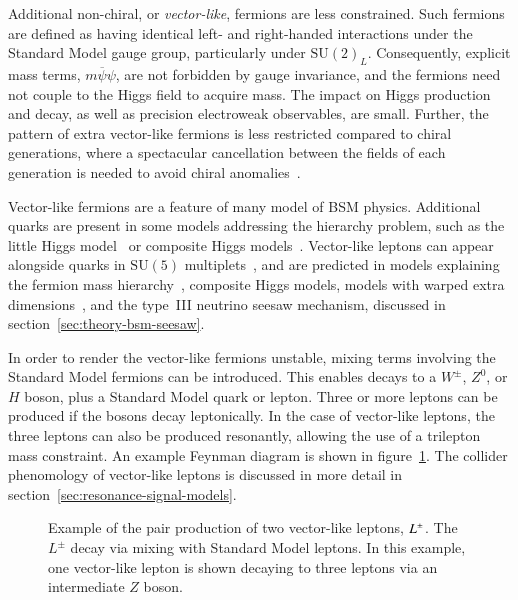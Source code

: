 Additional non-chiral, or \emph{vector-like}, fermions are less constrained. Such fermions are defined as having identical left- and right-handed interactions under the Standard Model gauge group, particularly under $\mathrm{SU}(2)_L$. Consequently, explicit mass terms, $m\overline{\psi}\psi$, are not forbidden by gauge invariance, and the fermions need not couple to the Higgs field to acquire mass. The impact on Higgs production and decay, as well as precision electroweak observables, are small. Further, the pattern of extra vector-like fermions is less restricted compared to chiral generations, where a spectacular cancellation between the fields of each generation is needed to avoid chiral anomalies~\cite{Geng:1988pr}. 

Vector-like fermions are a feature of many model of BSM physics. Additional quarks are present in some models addressing the hierarchy problem, such as the little Higgs model~\cite{Arkani-Hamed:557546} or composite Higgs models~\cite{Kaplan:148688}. Vector-like leptons can appear alongside quarks in $\mathrm{SU}(5)$ multiplets~\cite{Martin:2012dx}, and are predicted in models explaining the fermion mass hierarchy~\cite{Falkowski:2014hs}, composite Higgs models, models with warped extra dimensions~\cite{Redi:2013ib,Contino:1005586}, and the type~III neutrino seesaw mechanism, discussed in section~\ref{sec:theory-bsm-seesaw}. 

In order to render the vector-like fermions unstable, mixing terms involving the Standard Model fermions can be introduced. This enables decays to a $W^{\pm}$, $Z^0$, or $H$ boson, plus a Standard Model quark or lepton. Three or more leptons can be produced if the bosons decay leptonically. In the case of vector-like leptons, the three leptons can also be produced resonantly, allowing the use of a trilepton mass constraint. An example Feynman diagram is shown in figure~\ref{fig:theory-heavy-lepton-feynman-diagrams-cc}. The collider phenomology of vector-like leptons is discussed in more detail in section~\ref{sec:resonance-signal-models}.

\begin{figure}[htbp]
	\centering
	\caption{Example of the pair production of two vector-like leptons, $L^{\pm}$. The $L^{\pm}$ decay via mixing with Standard Model leptons. In this example, one vector-like lepton is shown decaying to three leptons via an intermediate $Z$ boson.}
	\label{fig:theory-heavy-lepton-feynman-diagrams-cc}
\end{figure}

